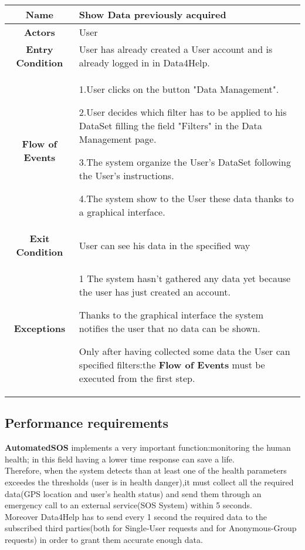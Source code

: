  \begin{table}[h!]
   \centering
    \begin{tabularx}{\linewidth}{|c|X|}
         \hline
         \textbf{Name} & Show Data previously acquired\\
	\hline
	\textbf{Actors} & User\\
	\hline
	\textbf{Entry Condition} & User has already created a User account and is already logged in in Data4Help.\\
	\hline
	\textbf{Flow of Events} &
					1.User clicks on the button "Data Management".

					2.User decides which filter has to be applied to his DataSet filling the field "Filters" in the Data 						Management page.

					3.The system organize the User's DataSet following the User's instructions.

					4.The system show to the User these data thanks to a graphical interface. \\
	\hline
	\textbf{Exit Condition} & User can see his data in the specified way\\
	
	\hline
	\textbf{Exceptions} & 1 The system hasn't gathered any data yet because the user has just created an account. 

				Thanks to the graphical interface the system notifies the user that no data can be shown.

				Only after having collected some data the User can specified filters:the \textbf{Flow of Events} must be 				executed from the first step.\\

        \hline
      \end{tabularx}
      \end{table}
  \subsection{Performance requirements}
\textbf{AutomatedSOS} implements a very important function:monitoring the human health; in this field having a lower time response can save a life.\\ Therefore, when the system detects than at least one of the health parameters exceedes the thresholds (user is in health danger),it must collect all the required data(GPS location and user's health status) and send them through an emergency call to an external service(SOS System) within 5 seconds.\\
Moreover Data4Help has to send every 1 second the required data to the subscribed third parties(both for Single-User requests and for Anonymous-Group requests) in order to grant them accurate enough data.
